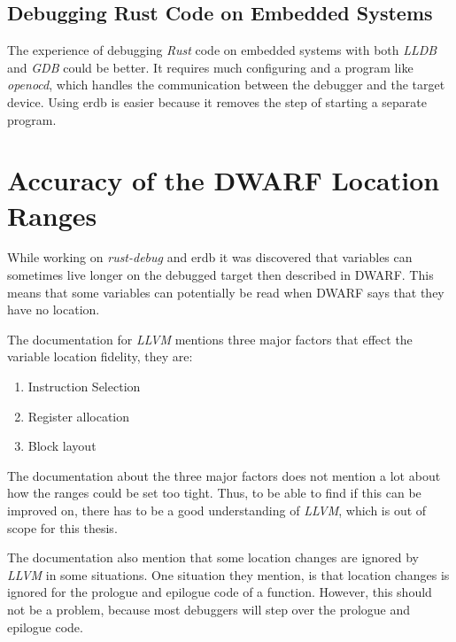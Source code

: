 \subsection{Debugging Rust Code on Embedded Systems}
The experience of debugging \emph{Rust} code on embedded systems with both \emph{LLDB} and \emph{GDB} could be better.
It requires much configuring and a program like \emph{openocd}, which handles the communication between the debugger and the target device.
Using \gls{erdb} is easier because it removes the step of starting a separate program.

\section{Accuracy of the DWARF Location Ranges}\label{section:loc-ranges}
While working on \emph{rust-debug} and \gls{erdb} it was discovered that variables can sometimes live longer on the debugged target then described in \gls{DWARF}.
This means that some variables can potentially be read when \gls{DWARF} says that they have no location.


The documentation for \emph{LLVM} \cite{llvm-dbs} mentions three major factors that effect the variable location fidelity, they are:

\begin{enumerate}
  \item Instruction Selection
  \item Register allocation
  \item Block layout
\end{enumerate}

The documentation about the three major factors does not mention a lot about how the ranges could be set too tight.
Thus, to be able to find if this can be improved on, there has to be a good understanding of \emph{LLVM}, which is out of scope for this thesis.


The documentation also mention that some location changes are ignored by \emph{LLVM} in some situations.
One situation they mention, is that location changes is ignored for the prologue and epilogue code of a function.
However, this should not be a problem, because most debuggers will step over the prologue and epilogue code.

